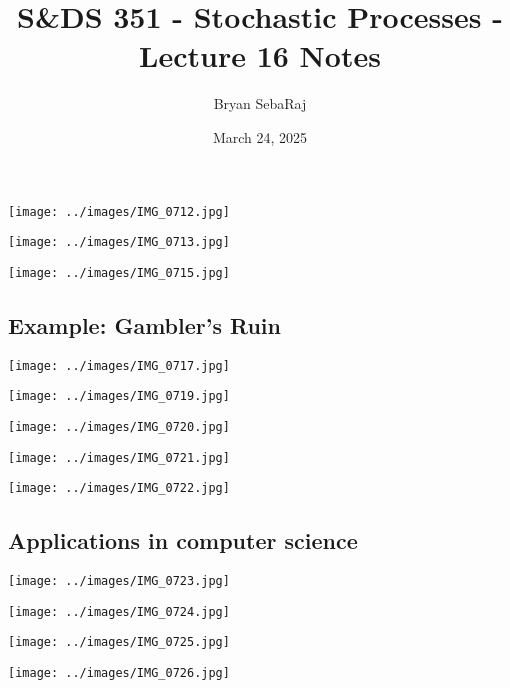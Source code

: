 \documentclass{article}
\title{S\&DS 351 - Stochastic Processes - Lecture 16 Notes}
\author{Bryan SebaRaj}
\date{March 24, 2025}
\begin{document}
\maketitle


\texttt{[image: ../images/IMG\_0712.jpg]}

\texttt{[image: ../images/IMG\_0713.jpg]}

\texttt{[image: ../images/IMG\_0715.jpg]}

\subsection*{Example: Gambler's Ruin}

\texttt{[image: ../images/IMG\_0717.jpg]}

\texttt{[image: ../images/IMG\_0719.jpg]}

\texttt{[image: ../images/IMG\_0720.jpg]}

\texttt{[image: ../images/IMG\_0721.jpg]}

\texttt{[image: ../images/IMG\_0722.jpg]}

\subsection*{Applications in computer science}

\texttt{[image: ../images/IMG\_0723.jpg]}

\texttt{[image: ../images/IMG\_0724.jpg]}

\texttt{[image: ../images/IMG\_0725.jpg]}

\texttt{[image: ../images/IMG\_0726.jpg]}
\end{document}
